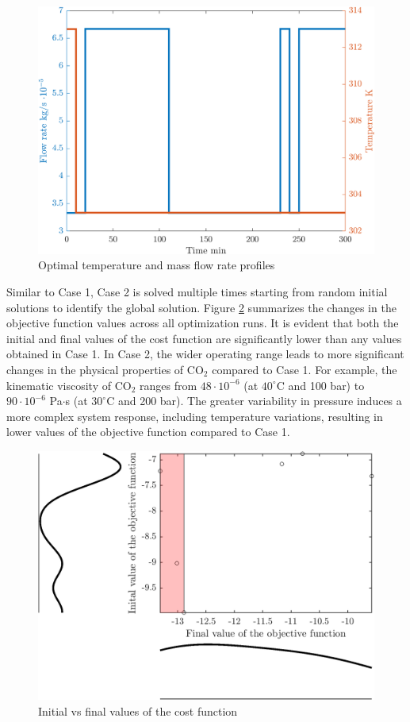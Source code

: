 \documentclass[../Article_Sensitivity_Analsysis.tex]{subfiles}
\begin{document}
	\begin{figure}[h!]
		\centering
		\includegraphics[width=\columnwidth]{Figures/Results/Profile_T_1.png}	
		\caption{Optimal temperature and mass flow rate profiles}
		\label{fig:profile_T}
	\end{figure}
	
	Similar to Case 1, Case 2 is solved multiple times starting from random initial solutions to identify the global solution. Figure \ref{fig:scatter_P} summarizes the changes in the objective function values across all optimization runs. It is evident that both the initial and final values of the cost function are significantly lower than any values obtained in Case 1. In Case 2, the wider operating range leads to more significant changes in the physical properties of CO$_2$ compared to Case 1. For example, the kinematic viscosity of CO$_2$ ranges from $48 \cdot 10^{-6}$ (at $40^\circ$C and 100 bar) to $90 \cdot 10^{-6}$ Pa$\cdot$s (at $30^\circ$C and 200 bar). The greater variability in pressure induces a more complex system response, including temperature variations, resulting in lower values of the objective function compared to Case 1.
	
	\begin{figure}[h!]
		\centering
		\includegraphics[width=\columnwidth]{Figures/Results/scatter_P.png}	
		\caption{Initial vs final values of the cost function}
		\label{fig:scatter_P}
	\end{figure}
	
\end{document}
